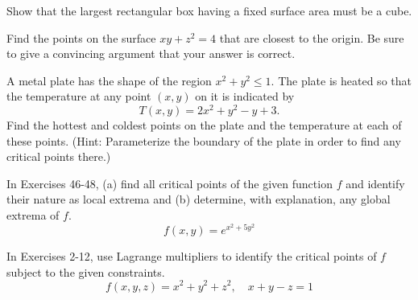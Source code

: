 \documentclass[12pt,letterpaper]{hmcpset}
\begin{document}

\begin{problem}[Colley 4.2.28]
    Show that the largest rectangular box having a fixed surface area
    must be a cube.
\end{problem}
\begin{solution}
    \vfill
\end{solution}
\newpage

\begin{problem}[Colley 4.2.30]
    Find the points on the surface $xy+z^2=4$ that are closest to the
    origin. Be sure to give a convincing argument that your answer is
    correct.
\end{problem}
\begin{solution}
    \vfill
\end{solution}
\newpage

\begin{problem}[Colley 4.2.34]
    A metal plate has the shape of the region $x^2+y^2\leq 1$. The
    plate is heated so that the temperature at any point $(x,y)$ on it
    is indicated by
    \[
        T(x,y)=2x^2+y^2-y+3.
    \]
    Find the hottest and coldest points on the plate and the
    temperature at each of these points. (Hint: Parameterize the
    boundary of the plate in order to find any critical points there.)
\end{problem}
\begin{solution}
    \vfill
\end{solution}
\newpage

\begin{problem}[Colley 4.2.46]
    In Exercises 46-48, (a) find all critical points of the given
    function $f$ and identify their nature as local extrema and (b)
    determine, with explanation, any global extrema of $f$.
    \[
        f(x,y)=e^{x^2+5y^2}
    \]
\end{problem}
\begin{solution}
    \vfill
\end{solution}
\newpage

\begin{problem}[Colley 4.3.6]
    In Exercises 2-12, use Lagrange multipliers to identify the
    critical points of $f$ subject to the given constraints.
    \[
        f(x,y,z)=x^2+y^2+z^2,\quad x+y-z=1
    \]
\end{problem}
\begin{solution}
    \vfill
\end{solution}
\newpage
\end{document}
